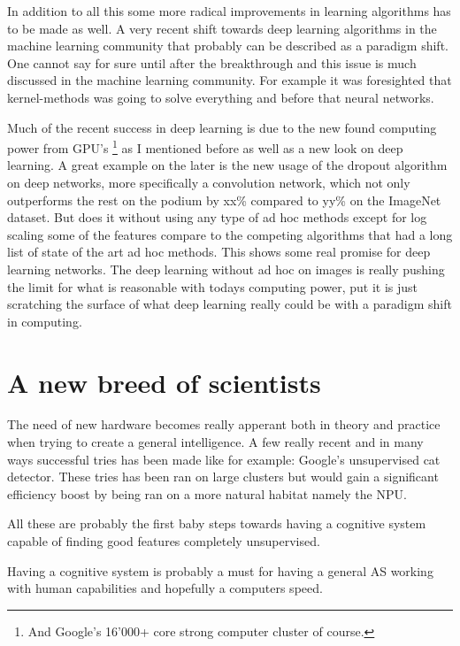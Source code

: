 \documentclass{article}
\begin{document}
    In addition to all this some more radical improvements in learning
    algorithms has to be made as well. A very recent shift towards deep
    learning algorithms in the machine learning community that probably can be
    described as a paradigm shift. One cannot say for sure until after the
    breakthrough and this issue is much discussed in the machine learning
    community. For example it was foresighted that kernel-methods was going to
    solve everything and before that neural networks.
   
    Much of the recent success in deep learning is due to the new found 
    computing power from GPU's
    \footnote{And Google's 16'000+ core strong computer cluster of course.} 
    as I mentioned before as well as a new look on deep learning. A great 
    example on the later is the new usage of the dropout algorithm on deep 
    networks, more specifically a convolution network, which not only 
    outperforms the rest on the podium by xx\% compared to yy\% on the ImageNet 
    dataset.\cite{imagenet}
    But does it without using any type of ad hoc methods except for log scaling 
    some of the features compare to the competing algorithms that had a long 
    list of state of the art ad hoc methods.\cite{dropout} This shows some real 
    promise for deep learning networks. The deep learning without ad hoc on
    images is really pushing the limit for what is reasonable with todays
    computing power, put it is just scratching the surface of what deep
    learning really could be with a paradigm shift in computing.

\section{A new breed of scientists}
    The need of new hardware becomes really apperant both in
    theory and practice when trying to create a general intelligence.
    A few really recent and in many ways successful tries has been made
    like for example: Google's unsupervised cat detector.\cite{catdetector}
    These tries has been ran on large clusters but would gain a
    significant efficiency boost by being ran on a more natural habitat namely 
    the NPU. 

    All these are probably the first baby steps towards having a cognitive
    system capable of finding good features completely unsupervised.

    Having a cognitive system is probably a must for having a general AS
    working with human capabilities and hopefully a computers speed.
\end{document}
